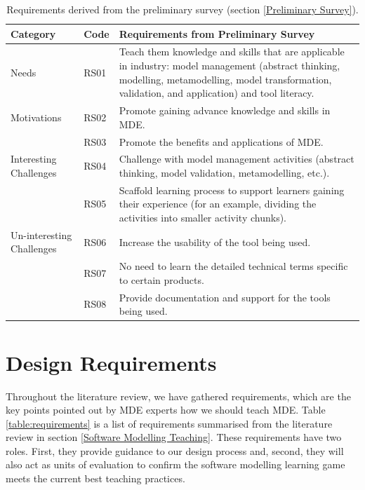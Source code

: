 \documentclass[12pt, a4paper]{report}
\begin{document}
\begin{table}[ht]
\caption{Requirements derived from the preliminary survey (section \ref{Preliminary Survey}).}
\label{table:preliminary-survey}
\begin{center}
\begin{tabular}{ p{2cm}p{1cm}p{10cm} } 
\hline
Category & Code & Requirements from Preliminary Survey \\
\hline
\multirow{1}{2cm}{Needs} 
& RS01 & Teach them knowledge and skills that are applicable in industry: model management (abstract thinking, modelling, metamodelling, model transformation, validation, and application) and tool literacy. \\ 
\hline
\multirow{1}{2cm}{Motivations}
& RS02 & Promote gaining advance knowledge and skills in MDE. \\ 
& RS03 & Promote the benefits and applications of MDE. \\ 
\hline
\multirow{1}{2cm}{Interesting Challenges}
& RS04 & Challenge with model management activities (abstract thinking, model validation, metamodelling, etc.). \\ 
& RS05 & Scaffold learning process to support learners gaining their experience (for an example, dividing the activities into smaller activity chunks). \\ 
\hline
\multirow{1}{2cm}{Un-interesting Challenges}
& RS06 & Increase the usability of the tool being used. \\ 
& RS07 & No need to learn the detailed technical terms specific to certain products. \\ 
& RS08 & Provide documentation and support for the tools being used. \\ 
\hline
\end{tabular}
\end{center}
\end{table}

\section{Design Requirements}
Throughout the literature review, we have gathered requirements, which are the key points pointed out by MDE experts how we should teach MDE. Table \ref{table:requirements} is a list of requirements summarised from the literature review in section \ref{Software Modelling Teaching}. These requirements have two roles. First, they provide guidance to our design process and, second, they will also act as units of evaluation to confirm the software modelling learning game meets the current best teaching practices. 
 
\end{document}
